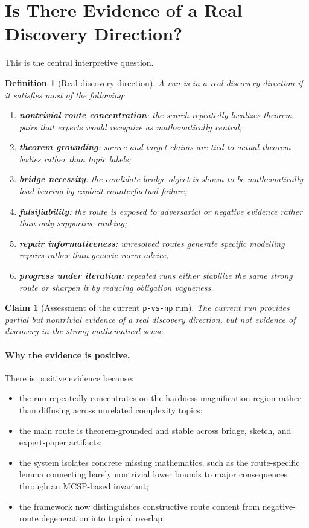 \documentclass[11pt]{article}
\newtheorem{definition}{Definition}
\newtheorem{claim}{Claim}
\begin{document}
\section{Is There Evidence of a Real Discovery Direction?}

This is the central interpretive question.

\begin{definition}[Real discovery direction]
A run is in a real discovery direction if it satisfies most of the following:
\begin{enumerate}[leftmargin=*,itemsep=0.25em]
\item \textbf{nontrivial route concentration}: the search repeatedly localizes theorem pairs that experts would recognize as mathematically central;
\item \textbf{theorem grounding}: source and target claims are tied to actual theorem bodies rather than topic labels;
\item \textbf{bridge necessity}: the candidate bridge object is shown to be mathematically load-bearing by explicit counterfactual failure;
\item \textbf{falsifiability}: the route is exposed to adversarial or negative evidence rather than only supportive ranking;
\item \textbf{repair informativeness}: unresolved routes generate specific modelling repairs rather than generic rerun advice;
\item \textbf{progress under iteration}: repeated runs either stabilize the same strong route or sharpen it by reducing obligation vagueness.
\end{enumerate}
\end{definition}

\begin{claim}[Assessment of the current \texttt{p-vs-np} run]
The current run provides \emph{partial but nontrivial} evidence of a real discovery direction, but not evidence of discovery in the strong mathematical sense.
\end{claim}

\paragraph{Why the evidence is positive.}

There is positive evidence because:

\begin{itemize}[leftmargin=*,itemsep=0.2em]
\item the run repeatedly concentrates on the hardness-magnification region rather than diffusing across unrelated complexity topics;
\item the main route is theorem-grounded and stable across bridge, sketch, and expert-paper artifacts;
\item the system isolates concrete missing mathematics, such as the route-specific lemma connecting barely nontrivial lower bounds to major consequences through an MCSP-based invariant;
\item the framework now distinguishes constructive route content from negative-route degeneration into topical overlap.
\end{itemize}
\end{document}
